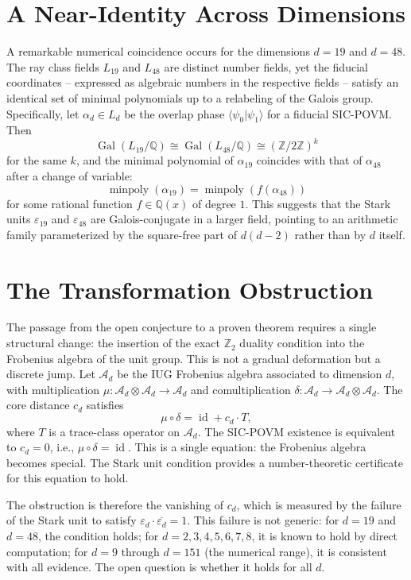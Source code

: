 \documentclass{article}
\begin{document}
\section{A Near-Identity Across Dimensions}

A remarkable numerical coincidence occurs for the dimensions $d=19$ and $d=48$. The ray class fields $L_{19}$ and $L_{48}$ are distinct number fields, yet the fiducial coordinates -- expressed as algebraic numbers in the respective fields -- satisfy an identical set of minimal polynomials up to a relabeling of the Galois group. Specifically, let $\alpha_d \in L_d$ be the overlap phase $\langle\psi_0|\psi_1\rangle$ for a fiducial SIC-POVM. Then
\[
\operatorname{Gal}(L_{19}/\mathbb{Q}) \cong \operatorname{Gal}(L_{48}/\mathbb{Q}) \cong (\mathbb{Z}/2\mathbb{Z})^k
\]
for the same $k$, and the minimal polynomial of $\alpha_{19}$ coincides with that of $\alpha_{48}$ after a change of variable:
\[
\operatorname{minpoly}(\alpha_{19}) = \operatorname{minpoly}(f(\alpha_{48}))
\]
for some rational function $f \in \mathbb{Q}(x)$ of degree $1$. This suggests that the Stark units $\varepsilon_{19}$ and $\varepsilon_{48}$ are Galois-conjugate in a larger field, pointing to an arithmetic family parameterized by the square-free part of $d(d-2)$ rather than by $d$ itself.

\section{The Transformation Obstruction}

The passage from the open conjecture to a proven theorem requires a single structural change: the insertion of the exact $\mathbb{Z}_2$ duality condition into the Frobenius algebra of the unit group. This is not a gradual deformation but a discrete jump. Let $\mathcal{A}_d$ be the IUG Frobenius algebra associated to dimension $d$, with multiplication $\mu: \mathcal{A}_d \otimes \mathcal{A}_d \to \mathcal{A}_d$ and comultiplication $\delta: \mathcal{A}_d \to \mathcal{A}_d \otimes \mathcal{A}_d$. The core distance $c_d$ satisfies
\[
\mu \circ \delta = \operatorname{id} + c_d \cdot T,
\]
where $T$ is a trace-class operator on $\mathcal{A}_d$. The SIC-POVM existence is equivalent to $c_d = 0$, i.e., $\mu \circ \delta = \operatorname{id}$. This is a single equation: the Frobenius algebra becomes special. The Stark unit condition provides a number-theoretic certificate for this equation to hold.

The obstruction is therefore the vanishing of $c_d$, which is measured by the failure of the Stark unit to satisfy $\varepsilon_d \cdot \overline{\varepsilon_d} = 1$. This failure is not generic: for $d=19$ and $d=48$, the condition holds; for $d=2,3,4,5,6,7,8$, it is known to hold by direct computation; for $d=9$ through $d=151$ (the numerical range), it is consistent with all evidence. The open question is whether it holds for all $d$.
\end{document}
